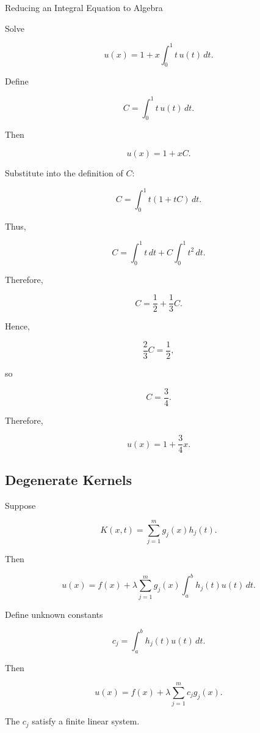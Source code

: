 \begin{workedexamplebox}{Reducing an Integral Equation to Algebra}

Solve

\[
u(x)
=
1
+
x
\int_0^1
t\,u(t)\,dt.
\]

Define

\[
C
=
\int_0^1
t\,u(t)\,dt.
\]

Then

\[
u(x)=1+xC.
\]

Substitute into the definition of \(C\):

\[
C
=
\int_0^1
t(1+tC)\,dt.
\]

Thus,

\[
C
=
\int_0^1t\,dt
+
C
\int_0^1t^2\,dt.
\]

Therefore,

\[
C
=
\frac12
+
\frac13C.
\]

Hence,

\[
\frac23C
=
\frac12,
\]

so

\[
C
=
\frac34.
\]

Therefore,

\begin{answerbox}
\[
\boxed{
u(x)
=
1+\frac34x.
}
\]
\end{answerbox}

\end{workedexamplebox}

\subsection{Degenerate Kernels}
\label{subsec:degenerate-kernels}

Suppose

\[
K(x,t)
=
\sum_{j=1}^{m}
g_j(x)h_j(t).
\]

Then

\[
u(x)
=
f(x)
+
\lambda
\sum_{j=1}^{m}
g_j(x)
\int_a^b
h_j(t)u(t)\,dt.
\]

Define unknown constants

\[
\boxed{
c_j
=
\int_a^b
h_j(t)u(t)\,dt.
}
\]

Then

\[
\boxed{
u(x)
=
f(x)
+
\lambda
\sum_{j=1}^{m}
c_jg_j(x).
}
\]

The \(c_j\) satisfy a finite linear system.

